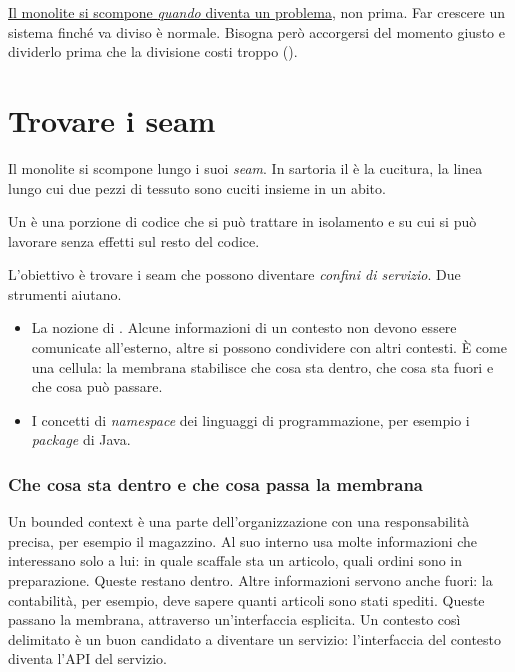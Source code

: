 \begin{idea}
\uline{Il monolite si scompone \emph{quando} diventa un problema}, non prima. Far crescere un sistema finché va diviso
è normale. Bisogna però accorgersi del momento giusto e dividerlo prima che la divisione costi troppo
().
\end{idea}

\section{Trovare i seam}
\label{sec:split-seam}

Il monolite si scompone lungo i suoi \emph{seam}. In sartoria il  è la cucitura, la linea lungo cui due pezzi
di tessuto sono cuciti insieme in un abito.

\begin{definizione}[Seam]
Un  è una porzione di codice che si può trattare in isolamento e su cui si può lavorare senza effetti sul
resto del codice.
\end{definizione}

L'obiettivo è trovare i seam che possono diventare \emph{confini di servizio}. Due strumenti aiutano.
\begin{itemize}
  \item La nozione di . Alcune informazioni di un contesto non devono essere comunicate
    all'esterno, altre si possono condividere con altri contesti. È come una cellula: la membrana stabilisce che cosa
    sta dentro, che cosa sta fuori e che cosa può passare.
  \item I concetti di \emph{namespace} dei linguaggi di programmazione, per esempio i \emph{package} di Java.
\end{itemize}

\subsubsection{Che cosa sta dentro e che cosa passa la membrana\aggiunta}
Un bounded context è una parte dell'organizzazione con una responsabilità precisa, per esempio il magazzino. Al suo
interno usa molte informazioni che interessano solo a lui: in quale scaffale sta un articolo, quali ordini sono in
preparazione. Queste restano dentro. Altre informazioni servono anche fuori: la contabilità, per esempio, deve sapere
quanti articoli sono stati spediti. Queste passano la membrana, attraverso un'interfaccia esplicita. Un contesto così
delimitato è un buon candidato a diventare un servizio: l'interfaccia del contesto diventa l'API del servizio.

